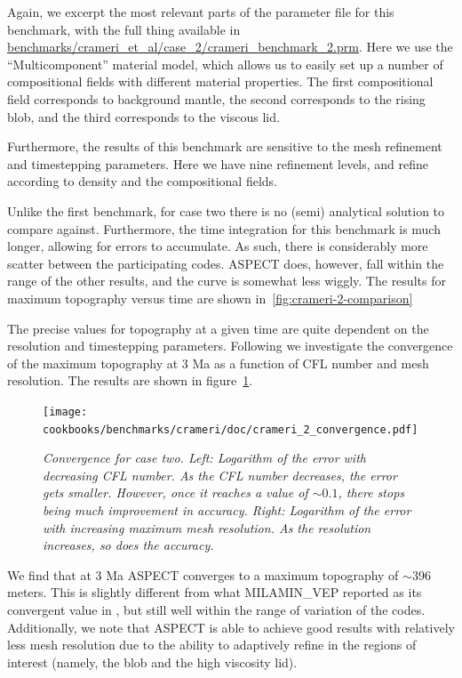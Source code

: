 \documentclass{article}
\newcommand{\aspect}{\textsc{ASPECT}}
\begin{document}
Again, we excerpt the most relevant parts of the parameter file for this benchmark, with the
full thing available in \url{benchmarks/crameri_et_al/case_2/crameri_benchmark_2.prm}.
Here we use the ``Multicomponent'' material model, which allows us to easily set up a number
of compositional fields with different material properties. The first compositional field
corresponds to background mantle, the second corresponds to the rising blob, and the third
corresponds to the viscous lid.


Furthermore, the results of this benchmark are sensitive to the mesh refinement and timestepping
parameters. Here we have nine refinement levels, and refine according to density and the
compositional fields.



Unlike the first benchmark, for case two there is no (semi) analytical solution to compare against.
Furthermore, the time integration for this benchmark is much longer, allowing for errors to
accumulate. As such, there is considerably more scatter between the participating codes.  \aspect{}
does, however, fall within the range of the other results, and the curve is somewhat less wiggly.
The results for maximum topography versus time are shown in~\ref{fig:crameri-2-comparison}

The precise values for topography at a given time are quite dependent on the resolution and
timestepping parameters. Following \cite{CSG12} we investigate the convergence of the maximum
topography at 3 Ma as a function of CFL number and mesh resolution.  The results are shown in
figure~\ref{fig:crameri-benchmark-convergence}.

\begin{figure}
  \begin{center}
    \texttt{[image: cookbooks/benchmarks/crameri/doc/crameri\_2\_convergence.pdf]}
  \end{center}
  \caption{\it Convergence for case two.  Left: Logarithm of the error with decreasing CFL number.
As the CFL number decreases, the error gets smaller. However, once it reaches a value of $\sim0.1$, there
stops being much improvement in accuracy. Right: Logarithm of the error with increasing maximum mesh
resolution. As the resolution increases, so does the accuracy.}
  \label{fig:crameri-benchmark-convergence}
\end{figure}

We find that at 3 Ma \aspect{}  converges to a maximum topography of $\sim$396 meters.
This is slightly different from what MILAMIN\_VEP reported as its convergent value in \cite{CSG12},
but still well within the range of variation of the codes. Additionally, we note that \aspect{}
is able to achieve good results with relatively less mesh resolution due to the ability
to adaptively refine in the regions of interest (namely, the blob and the high viscosity lid).
\end{document}
